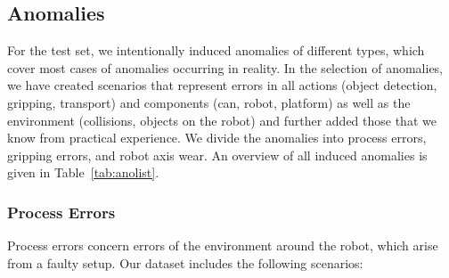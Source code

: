 \documentclass[journal]{IEEEtran}
\begin{document}
\subsection{Anomalies}
\label{anomalies}
For the test set, we intentionally induced anomalies of different types, which cover most cases of anomalies occurring in reality.
{In the selection of anomalies, we have created scenarios that represent errors in all actions (object detection, gripping, transport) and components (can, robot, platform) as well as the environment (collisions, objects on the robot) and further added those that we know from practical experience.}
We divide the anomalies into process errors, gripping errors, and robot axis wear.
An overview of all induced anomalies is given in Table~\ref{tab:anolist}.

\subsubsection{Process Errors} 
Process errors concern errors of the environment around the robot, which arise from a faulty setup.
Our dataset includes the following scenarios:
\end{document}
